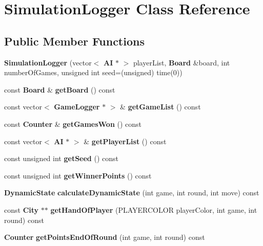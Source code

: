 \section{Simulation\-Logger Class Reference}
\label{class_simulation_logger}
\subsection*{Public Member Functions}
\begin{DoxyCompactItemize}
\item 
{\bfseries Simulation\-Logger} (vector$<$ {\bf A\-I} $\ast$ $>$ player\-List, {\bf Board} \&board, int number\-Of\-Games, unsigned int seed=(unsigned) time(0))\label{class_simulation_logger_a1bd6ad9e03211cee83757c567c14195b}

\item 
const {\bf Board} \& {\bfseries get\-Board} () const \label{class_simulation_logger_a5ed89aaa870ff9323be5f8f82da95f4a}

\item 
const vector$<$ {\bf Game\-Logger} $\ast$ $>$ \& {\bfseries get\-Game\-List} () const \label{class_simulation_logger_af92f6d16f918a385ccfa0d9b6a8823b3}

\item 
const {\bf Counter} \& {\bfseries get\-Games\-Won} () const \label{class_simulation_logger_a1a8d238597cef51d85bef2cd397bfb4d}

\item 
const vector$<$ {\bf A\-I} $\ast$ $>$ \& {\bfseries get\-Player\-List} () const \label{class_simulation_logger_ac089019f8358d4bb5bb5d92504e40ca4}

\item 
const unsigned int {\bfseries get\-Seed} () const \label{class_simulation_logger_ac9f1225d9d932eb90ccdde1c4149d212}

\item 
const unsigned int {\bfseries get\-Winner\-Points} () const \label{class_simulation_logger_af90bd066ae1f1012384f87662f19eb8f}

\item 
{\bf Dynamic\-State} {\bfseries calculate\-Dynamic\-State} (int game, int round, int move) const \label{class_simulation_logger_a1929c74a77d05af475b262b65acc4258}

\item 
const {\bf City} $\ast$$\ast$ {\bfseries get\-Hand\-Of\-Player} (P\-L\-A\-Y\-E\-R\-C\-O\-L\-O\-R player\-Color, int game, int round) const \label{class_simulation_logger_ac063a9256c51c6b52a0684392615f7bc}

\item 
{\bf Counter} {\bfseries get\-Points\-End\-Of\-Round} (int game, int round) const \label{class_simulation_logger_acba8730ff613b90317ab11723a1db404}

\end{DoxyCompactItemize}
